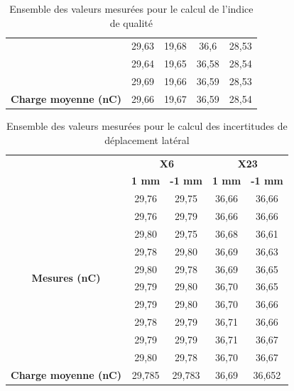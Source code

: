\documentclass{article}
\begin{document}
\begin{table}[h]
\begin{tabular}{c|cc|cc|}
  \multicolumn{1}{|c|}{}                                        & 29,63           & 19,68          & 36,6            & 28,53           \\
  \multicolumn{1}{|c|}{}                                        & 29,64           & 19,65          & 36,58           & 28,54           \\
  \multicolumn{1}{|c|}{}                                        & 29,69           & 19,66          & 36,59           & 28,53           \\ \hline
  \multicolumn{1}{|c|}{\textbf{Charge moyenne   (nC)}}          & 29,66           & 19,67          & 36,59           & 28,54           \\ \hline
  \end{tabular}
  \caption{Ensemble des valeurs mesurées pour le calcul de l'indice de qualité}
  \label{table_mesures_IQ}
\end{table}

\begin{table}[h]
  \centering
  \begin{tabular}{c|cc|cc|}
  \cline{2-5}
  \textbf{}                                                     & \multicolumn{2}{c|}{\textbf{X6}} & \multicolumn{2}{c|}{\textbf{X23}} \\ \cline{2-5} 
  \textbf{}                                                     & \textbf{1 mm}     & \textbf{-1 mm}     & \textbf{1 mm}      & \textbf{-1 mm}     \\ \hline
  \multicolumn{1}{|c|}{\multirow{10}{*}{\textbf{Mesures (nC)}}} & 29,76          & 29,75           & 36,66           & 36,66           \\
  \multicolumn{1}{|c|}{} & 29,76 & 29,79 & 36,66 & 36,66 \\
  \multicolumn{1}{|c|}{} & 29,80 & 29,75 & 36,68 & 36,61 \\
  \multicolumn{1}{|c|}{} & 29,78 & 29,80 & 36,69 & 36,63 \\
  \multicolumn{1}{|c|}{} & 29,80 & 29,78 & 36,69 & 36,65 \\
  \multicolumn{1}{|c|}{} & 29,79 & 29,80 & 36,70 & 36,65 \\
  \multicolumn{1}{|c|}{} & 29,79 & 29,80 & 36,70 & 36,66 \\
  \multicolumn{1}{|c|}{} & 29,78 & 29,79 & 36,71 & 36,66 \\
  \multicolumn{1}{|c|}{} & 29,79 & 29,79 & 36,71 & 36,67 \\
  \multicolumn{1}{|c|}{} & 29,80 & 29,78 & 36,70 & 36,67 \\ \hline
  \multicolumn{1}{|c|}{\textbf{Charge moyenne   (nC)}}          & 29,785         & 29,783          & 36,69           & 36,652          \\ \hline
  \end{tabular}
  \caption{Ensemble des valeurs mesurées pour le calcul des incertitudes de déplacement latéral}
  \label{table_mesure_dep_lat}
\end{table}
\end{document}
